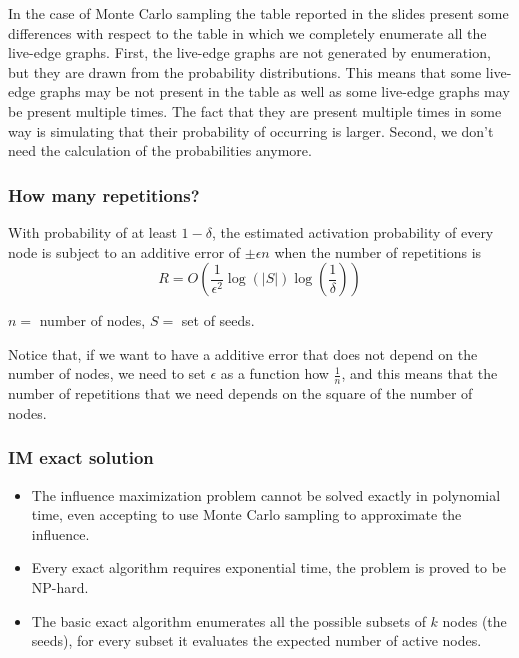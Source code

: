 \documentclass[10pt,a4paper]{article}
\begin{document}
In the case of Monte Carlo sampling the table reported in the slides present some differences with respect to the table in which we completely enumerate all the live-edge graphs. First, the live-edge graphs are not generated by enumeration, but they are drawn from the probability distributions. This means that some live-edge graphs may be not present in the table as well as some live-edge graphs may be present multiple times. The fact that they are present multiple times in some way is simulating that their probability of occurring is larger. Second, we don't need the calculation of the probabilities anymore.

\subsubsection{How many repetitions?}\label{how-many-repetitions}

With probability of at least $1-\delta$, the estimated activation probability of every node is subject to an additive error of $\pm \epsilon n$ when the number of repetitions is
$$R = O\left(\frac{1}{\epsilon^2} \log{\left(|S|\right)} \log{\left(\frac{1}{\delta}\right)}\right)$$

$n =$ number of nodes, $S=$ set of seeds.

Notice that, if we want to have a additive error that does not depend on the number of nodes, we need to set $\epsilon$ as a function how $\frac{1}{n}$, and this means that the number of repetitions that we need depends on the square of the number of nodes.

\subsubsection{IM exact solution}\label{im-exact-solution}

\begin{itemize}

\item The influence maximization problem cannot be solved exactly in polynomial time, even accepting to use Monte Carlo sampling to approximate the influence.
\item Every exact algorithm requires exponential time, the problem is proved to be NP-hard.
\item The basic exact algorithm enumerates all the possible subsets of $k$ nodes (the seeds), for every subset it evaluates the expected number of active nodes.
\end{itemize}
\end{document}
